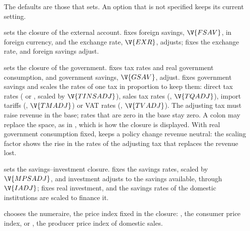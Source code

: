 The defaults are those that  sets. An option that is not
specified keeps its current setting.


\begin{optdesc}
\item[\opt{ext}{ernal}\cmd{(flexexr|fixexr)}] sets the closure of the
external account.  fixes foreign savings, $\V{FSAV}$, in foreign
currency, and the exchange rate, $\V{EXR}$, adjusts;  fixes the
exchange rate, and foreign savings adjust.

\item[\optarg{gov}{ernment}{spec}] sets the closure of the government.
 fixes tax rates and real government consumption, and
government savings, $\V{GSAV}$, adjust.  fixes government savings
and scales the rates of one tax in proportion to keep them: direct tax rates
( or , scaled by $\V{TINSADJ}$), sales tax
rates (, $\V{TQADJ}$), import tariffs
(, $\V{TMADJ}$) or VAT rates (,
$\V{TVADJ}$). The adjusting tax must raise revenue in the base; rates that are
zero in the base stay zero. A colon may replace the space, as in
, which is how the closure is displayed. With real government
consumption fixed,  keeps a policy change revenue neutral: the
scaling factor shows the rise in the rates of the adjusting tax that replaces
the revenue lost.

\item[\opt{sav}{inv}\cmd{(savings|investment)}] sets the
savings--investment closure.  fixes the savings rates, scaled by
$\V{MPSADJ}$, and investment adjusts to the savings available, through
$\V{IADJ}$;  fixes real investment, and the savings rates of
the domestic institutions are scaled to finance it.

\item[\opt{num}{eraire}\cmd{(cpi|dpi)}] chooses the numeraire, the
price index fixed in the closure: , the consumer price index, or
, the producer price index of domestic sales.


\end{optdesc}
